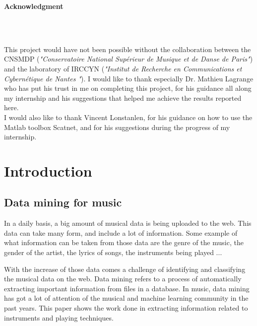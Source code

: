 \documentclass[hidelinks,12pt]{report}
\begin{document}
\begin{center}
\begin{large}
\textbf{Acknowledgment} 
\end{large}\\~\\
\end{center}
\par This project would have not been possible without the collaboration between the CNSMDP  (\textit{"Conservatoire National Supérieur de Musique et de Danse de Paris"}) and the laboratory of IRCCYN (\textit{"Institut de Recherche en Communications et Cybernétique de Nantes
"}). I would like to thank especially Dr. Mathieu Lagrange who has put his trust in me on completing this project, for his guidance all along my internship and his suggestions that helped me achieve the results reported here.\\ I would also like to thank Vincent Lonstanlen, for his guidance on how to use the Matlab toolbox Scatnet, and for his suggestions during the progress of my internship.
\thispagestyle{empty}
\newpage
\tableofcontents
\thispagestyle{empty}
\newpage
\clearpage
\thispagestyle{empty}
\newpage
\listoffigures
\thispagestyle{empty}
\listoftables
\thispagestyle{empty}
\newpage
\clearpage
\setcounter{page}{1}
\noindent




\chapter{Introduction}

\section{Data mining for music}
In a daily basis, a big amount of musical data is being uploaded to the web. This data can take many form, and include a lot of information. Some example of what information can be taken from those data are the genre of the music, the gender of the artist, the lyrics of songs, the instruments being played ...\par
With the increase of those data comes a challenge of identifying and classifying the musical data on the web. Data mining refers to a process of automatically extracting important information from files in a database. In music, data mining has got a lot of attention of the musical and machine learning community in the past years. This paper shows the work done in extracting information related to instruments and playing techniques.
\end{document}
